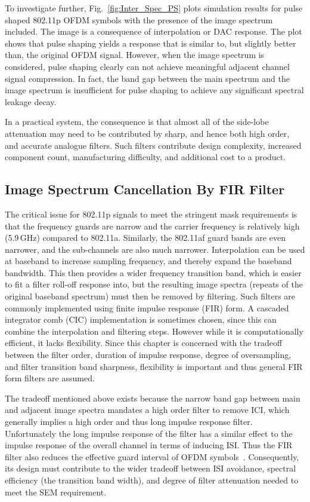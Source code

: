 To investigate further, Fig.~\ref{fig:Inter_Spec_PS} plots simulation results for pulse shaped 802.11p OFDM symbols with the presence of the image spectrum included.
The image is a consequence of interpolation or DAC response.
The plot shows that pulse shaping yields a response that is similar to, but slightly better than, the original OFDM signal.
However, when the image spectrum is considered, pulse shaping clearly can not achieve meaningful adjacent channel signal compression.
In fact, the band gap between the main spectrum and the image spectrum is insufficient for pulse shaping to achieve any significant spectral leakage decay.

In a practical system, the consequence is that almost all of the side-lobe attenuation may need to be contributed by sharp, and hence both high order, and accurate analogue filters.
Such filters contribute design complexity, increased component count, manufacturing difficulty, and additional cost to a product.

\subsection{Image Spectrum Cancellation By FIR Filter}
\label{subsec:FIR}
The critical issue for 802.11p signals to meet the stringent mask requirements is that the frequency guards are narrow and the carrier frequency is relatively high (5.9\,GHz) compared to 802.11a.
Similarly, the 802.11af guard bands are even narrower, and the sub-channels are also much narrower.
Interpolation can be used at baseband to increase sampling frequency, and thereby expand the baseband bandwidth.
This then provides a wider frequency transition band, which is easier to fit a filter roll-off response into, but the resulting image spectra (repeats of the original baseband spectrum) must then be removed by filtering.
Such filters are commonly implemented using finite impulse response (FIR) form.
A cascaded integrator comb (CIC) implementation is sometimes chosen, since this can combine the interpolation and filtering steps.
However while it is computationally efficient, it lacks flexibility.
Since this chapter is concerned with the tradeoff between the filter order, duration of impulse response, degree of oversampling, and filter transition band sharpness, flexibility is important and thus general FIR form filters are assumed.

The tradeoff mentioned above exists because the narrow band gap between main and adjacent image spectra mandates a high order filter to remove ICI, which generally implies a high order and thus long impulse response filter.
Unfortunately the long impulse response of the filter has a similar effect to the impulse response of the overall channel in terms of inducing ISI.
Thus the FIR filter also reduces the effective guard interval of OFDM symbols~\cite{farhang2008signal}.
Consequently, its design must contribute to the wider tradeoff between ISI avoidance, spectral efficiency (the transition band width), and degree of filter attenuation needed to meet the SEM requirement.

